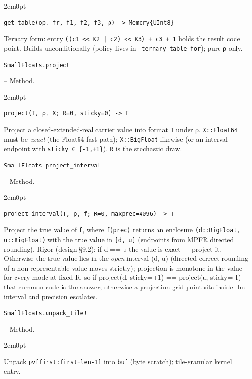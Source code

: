 \begin{adjustwidth}{2em}{0pt}


\begin{verbatim}
get_table(op, fr, f1, f2, f3, ρ) -> Memory{UInt8}
\end{verbatim}

Ternary form: entry \texttt{((c1 << K2 | c2) << K3) + c3 + 1} holds the result code point. Builds unconditionally (policy lives in \texttt{\_ternary\_table\_for}); pure ρ only.



\end{adjustwidth}
\hypertarget{16932623480385077633}{\texttt{SmallFloats.project}}  -- {Method.}

\begin{adjustwidth}{2em}{0pt}


\begin{verbatim}
project(T, ρ, X; R=0, sticky=0) -> T
\end{verbatim}

Project a closed-extended-real carrier value into format \texttt{T} under ρ. \texttt{X::Float64} must be \emph{exact} (the Float64 fast path); \texttt{X::BigFloat} likewise (or an interval endpoint with \texttt{sticky ∈ \{-1,+1\}}). \texttt{R} is the stochastic draw.



\end{adjustwidth}
\hypertarget{1151381039512186337}{\texttt{SmallFloats.project\_interval}}  -- {Method.}

\begin{adjustwidth}{2em}{0pt}


\begin{verbatim}
project_interval(T, ρ, f; R=0, maxprec=4096) -> T
\end{verbatim}

Project the true value of \texttt{f}, where \texttt{f(prec)} returns an enclosure \texttt{(d::BigFloat, u::BigFloat)} with the true value in \texttt{[d, u]} (endpoints from MPFR directed rounding). Rigor (design §9.2): if d == u the value is exact — project it. Otherwise the true value lies in the \emph{open} interval (d, u) (directed correct rounding of a non-representable value moves strictly); projection is monotone in the value for every mode at fixed R, so if project(d, sticky=+1) == project(u, sticky=-1) that common code is the answer; otherwise a projection grid point sits inside the interval and precision escalates.



\end{adjustwidth}
\hypertarget{835860055659755424}{\texttt{SmallFloats.unpack\_tile!}}  -- {Method.}

\begin{adjustwidth}{2em}{0pt}

Unpack \texttt{pv[first:first+len-1]} into \texttt{buf} (byte scratch); tile-granular kernel entry.



\end{adjustwidth}


